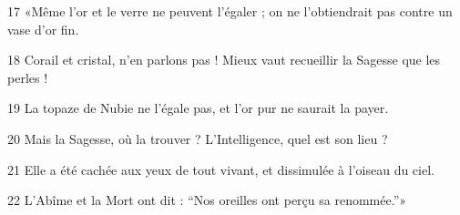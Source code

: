 
17 «Même l’or et le verre ne peuvent l’égaler ; on ne l’obtiendrait pas contre un vase d’or fin.

18 Corail et cristal, n’en parlons pas ! Mieux vaut recueillir la Sagesse que les perles !

19 La topaze de Nubie ne l’égale pas, et l’or pur ne saurait la payer.

20 Mais la Sagesse, où la trouver ? L’Intelligence, quel est son lieu ?

21 Elle a été cachée aux yeux de tout vivant, et dissimulée à l’oiseau du ciel.

22 L’Abîme et la Mort ont dit : “Nos oreilles ont perçu sa renommée.”»
